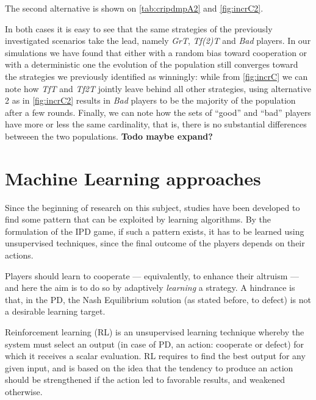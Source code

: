 \documentclass[journal,10pt,twoside]{IEEEtran}
\begin{document}

The second alternative is shown on \autoref{tab:cripdmpA2} and \autoref{fig:incrC2}.

In both cases it is easy to see that the same strategies of the previously investigated scenarios take the lead, namely \textit{GrT}, \textit{Tf(2)T} and \textit{Bad} players. In our simulations we have found that either with a random bias toward cooperation or with a deterministic one the evolution of the population still converges toward the strategies we previously identified as winningly: while from \autoref{fig:incrC} we can note how \textit{TfT} and \textit{Tf2T} jointly leave behind all other strategies, using alternative 2 as in \autoref{fig:incrC2} results in \textit{Bad} players to be the majority of the population after a few rounds.
Finally, we can note how the sets of ``good'' and ``bad'' players have more or less the same cardinality, that is, there is no substantial differences betweeen the two populations.
\textbf{Todo maybe expand?}

\section{Machine Learning approaches} \label{s:ml}
Since the beginning of research on this subject, studies have been developed to find some pattern that can be exploited by learning algorithms.
By the formulation of the IPD game, if such a pattern exists, it has to be learned using unsupervised techniques, since the final outcome of the players depends on their actions.

Players should learn to cooperate --- equivalently, to enhance their altruism --- and here the aim is to do so by adaptively \textit{learning} a strategy. A hindrance is that, in the PD, the Nash Equilibrium solution (as stated before, to defect) is not a desirable learning target.~\cite{coopSeqRL}

Reinforcement learning (RL) is an unsupervised learning technique whereby the system must select an output (in case of PD, an action: cooperate or defect) for which it receives a scalar evaluation. RL requires to find the best output for any given input, and is based on the idea that the tendency to produce an action should be strengthened if the action led to favorable results, and weakened otherwise.~\cite{sandholmRL}
\end{document}
